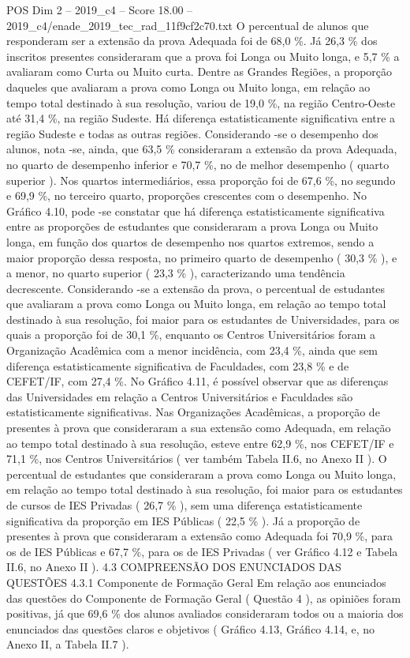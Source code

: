 \begin{textsample}{POS Dim 2 – 2019\_c4 – Score 18.00 – 2019\_c4/enade\_2019\_tec\_rad\_11f9cf2c70.txt}
O percentual de alunos que responderam ser a extensão da prova Adequada foi de 68,0 \%.
Já 26,3 \% dos inscritos presentes consideraram que a prova foi Longa ou Muito longa, e 5,7 \% a avaliaram como Curta ou Muito curta.
Dentre as Grandes Regiões, a proporção daqueles que avaliaram a prova como Longa ou Muito longa, em relação ao tempo total destinado à sua resolução, variou de 19,0 \%, na região Centro-Oeste até 31,4 \%, na região Sudeste.
Há diferença estatisticamente significativa entre a região Sudeste e todas as outras regiões.
Considerando -se o desempenho dos alunos, nota -se, ainda, que 63,5 \% consideraram a extensão da prova Adequada, no quarto de desempenho inferior e 70,7 \%, no de melhor desempenho ( quarto superior ).
Nos quartos intermediários, essa proporção foi de 67,6 \%, no segundo e 69,9 \%, no terceiro quarto, proporções crescentes com o desempenho.
No Gráfico 4.10, pode -se constatar que há diferença estatisticamente significativa entre as proporções de estudantes que consideraram a prova Longa ou Muito longa, em função dos quartos de desempenho nos quartos extremos, sendo a maior proporção dessa resposta, no primeiro quarto de desempenho ( 30,3 \% ), e a menor, no quarto superior ( 23,3 \% ), caracterizando uma tendência decrescente.
Considerando -se a extensão da prova, o percentual de estudantes que avaliaram a prova como Longa ou Muito longa, em relação ao tempo total destinado à sua resolução, foi maior para os estudantes de Universidades, para os quais a proporção foi de 30,1 \%, enquanto os Centros Universitários foram a Organização Acadêmica com a menor incidência, com 23,4 \%, ainda que sem diferença estatisticamente significativa de Faculdades, com 23,8 \% e de CEFET/IF, com 27,4 \%.
No Gráfico 4.11, é possível observar que as diferenças das Universidades em relação a Centros Universitários e Faculdades são estatisticamente significativas.
Nas Organizações Acadêmicas, a proporção de presentes à prova que consideraram a sua extensão como Adequada, em relação ao tempo total destinado à sua resolução, esteve entre 62,9 \%, nos CEFET/IF e 71,1 \%, nos Centros Universitários ( ver também Tabela II.6, no Anexo II ).
O percentual de estudantes que consideraram a prova como Longa ou Muito longa, em relação ao tempo total destinado à sua resolução, foi maior para os estudantes de cursos de IES Privadas ( 26,7 \% ), sem uma diferença estatisticamente significativa da proporção em IES Públicas ( 22,5 \% ).
Já a proporção de presentes à prova que consideraram a extensão como Adequada foi 70,9 \%, para os de IES Públicas e 67,7 \%, para os de IES Privadas ( ver Gráfico 4.12 e Tabela II.6, no Anexo II ). 4.3 COMPREENSÃO DOS ENUNCIADOS DAS QUESTÕES 4.3.1 Componente de Formação Geral Em relação aos enunciados das questões do Componente de Formação Geral ( Questão 4 ), as opiniões foram positivas, já que 69,6 \% dos alunos avaliados consideraram todos ou a maioria dos enunciados das questões claros e objetivos ( Gráfico 4.13, Gráfico 4.14, e, no Anexo II, a Tabela II.7 ).

\end{textsample}

